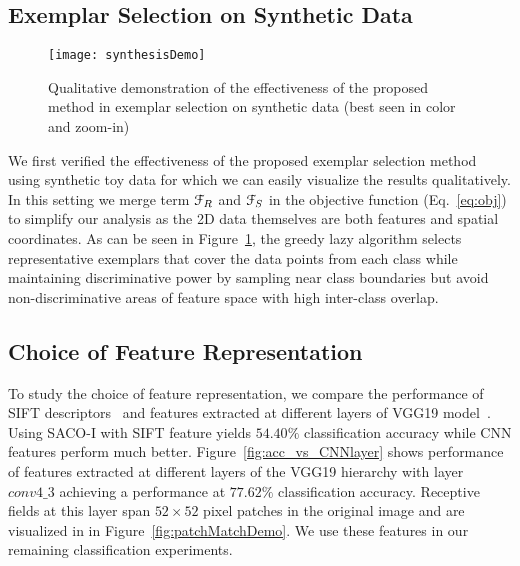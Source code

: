 \documentclass[10pt,twocolumn,letterpaper]{article}
\begin{document}



\subsection{Exemplar Selection on Synthetic Data}
\label{ssec:synthesisExemplar}
\begin{figure}[t]
\centering
   \texttt{[image: synthesisDemo]}
\vspace{-1mm}
   \caption{Qualitative demonstration of the effectiveness of the proposed
   method in exemplar selection on synthetic data (best seen in color and zoom-in)}
\vspace{-2mm}
\label{fig:synthesisDemo}
\end{figure}

We first verified the effectiveness of the proposed exemplar selection method
using synthetic toy data for which we can easily visualize the results
qualitatively.  In this setting we merge term  ${\cal F}_R$ and  ${\cal F}_S$ in the objective
function (Eq.~\ref{eq:obj}) to simplify our analysis as the 2D data themselves are
both features and spatial coordinates.
As can be seen in Figure~\ref{fig:synthesisDemo}, the greedy lazy
algorithm selects representative exemplars that cover the data points from
each class while maintaining discriminative power by sampling near class
boundaries but avoid non-discriminative areas of feature space with high
inter-class overlap.


\subsection{Choice of Feature Representation}
To study the choice of feature representation, we compare the performance of
SIFT descriptors~\cite{lowe2004distinctive} and features extracted at different
layers of VGG19 model~\cite{simonyan2014very}.  Using SACO-I with SIFT feature
yields $54.40\%$ classification accuracy while CNN features perform much
better.  Figure~\ref{fig:acc_vs_CNNlayer} shows performance of features
extracted at different layers of the VGG19 hierarchy with layer $conv4\_3$
achieving a performance at $77.62\%$ classification accuracy. Receptive fields
at this layer span $52\times52$ pixel patches in the original image and are
visualized in in Figure~\ref{fig:patchMatchDemo}.  We use these features in our
remaining classification experiments.
\end{document}
